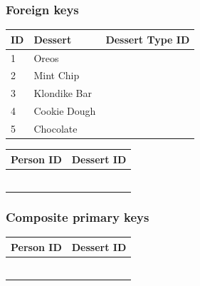 \documentclass[aspectratio=169]{beamer}
\begin{document}
\begin{frame}
  \frametitle{Foreign keys}

  \begin{table}
    \footnotesize
    \begin{tabular}[T]{@{}lll@{}}
      \toprule
      ID & Dessert      & Dessert Type ID \\ \midrule
      1  & Oreos        & \color{red}{1}  \\
      2  & Mint Chip    & \color{red}{2}  \\
      3  & Klondike Bar & \color{red}{3}  \\
      4  & Cookie Dough & \color{red}{2}  \\
      5  & Chocolate    & \color{red}{2}  \\ \bottomrule
    \end{tabular}
  \end{table}
  \begin{table}[]
    \footnotesize
    \begin{tabular}{@{}ll@{}}
      \toprule
      Person ID         & Dessert ID        \\ \midrule
      \color{purple}{1} & \color{purple}{1} \\
      \color{purple}{1} & \color{purple}{2} \\
      \color{purple}{2} & \color{purple}{3} \\
      \color{purple}{3} & \color{purple}{2} \\
      \color{purple}{4} & \color{purple}{4} \\
      \color{purple}{5} & \color{purple}{5} \\ \bottomrule
    \end{tabular}
  \end{table}
\end{frame}

\begin{frame}
  \frametitle{Composite primary keys}
  \begin{table}[]
    \footnotesize
    \begin{tabular}{@{}ll@{}}
      \toprule
      Person ID         & Dessert ID        \\ \midrule
      \color{purple}{1} & \color{purple}{1} \\
      \color{purple}{1} & \color{purple}{2} \\
      \color{purple}{2} & \color{purple}{3} \\
      \color{purple}{3} & \color{purple}{2} \\
      \color{purple}{4} & \color{purple}{4} \\
      \color{purple}{5} & \color{purple}{5} \\ \bottomrule
    \end{tabular}
  \end{table}
\end{frame}
\end{document}

